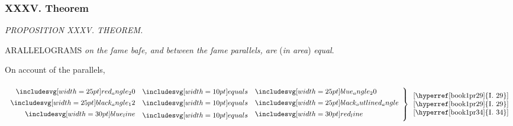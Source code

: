 \documentclass[11pt,preview]{standalone}
\begin{document}
\subsubsection{XXXV. Theorem}

\begin{minipage}[t]{0.43\textwidth}
    \vspace{16pt}
    
\end{minipage}%
\hfill
\begin{minipage}[t]{0.55\textwidth}
    \begin{center}
        \textit{PROPOSITION XXXV. THEOREM.}\label{book1pr35} \\
    \end{center}

    \hfill

    \begin{center}
        \raggedright \lettrine[lines=3, loversize=1, nindent=0pt]{}{}ARALLELOGRAMS \textit{on the ſame baſe, and between the ſame parallels, are} (\textit{in area}) \textit{equal}.
    \end{center}
\end{minipage}

\hfill

\hfill

\begin{center}
    On account of the parallels,\\
    \hfill\\
    $\left.\begin{aligned}\img{red_angle_20} & \bequals \img{blue_angle_20} \\ \img{black_angle_12} & \bequals \img{black_outlined_angle} \\ \blueline & \bequals \redline \end{aligned}\right\}\begin{array}{l}\text{[\hyperref[book1pr29]{\textsc{I.} 29}]} \\ \text{[\hyperref[book1pr29]{\textsc{I.} 29}]} \\ \text{[\hyperref[book1pr34]{\textsc{I.} 34}]} \end{array}$
\end{center}

\hfill

\hfill
\end{document}
